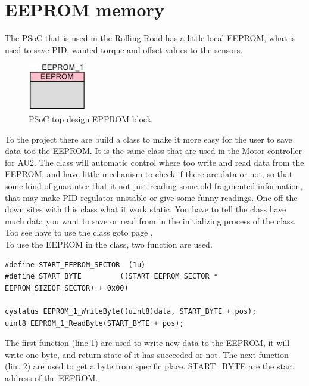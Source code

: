 \newpage
\section{EEPROM memory}
The PSoC that is used in the Rolling Road has a little local EEPROM, what is used to save PID, wanted torque and offset values to the sensors.

\begin{figure}[H]
	\centering
	\includegraphics [width=1in]{Software/Pictures/EEPROM_block.PNG}
	\caption{PSoC top design EPPROM block}
	\label{fig:EEPROM_block}
\end{figure}

To the project there are build a class to make it more easy for the user to save data too the EEPROM. It is the same class that are used in the Motor controller for AU2. The class will automatic control where too write and read data from the EEPROM, and have little mechanism to check if there are data or not, so that some kind of guarantee that it not just reading some old fragmented information, that may make PID regulator unstable or give some funny readings. One off the down sites with this class what it work static. You have to tell the class have much data you want to save or read from in the initializing process of the class. Too see have to use the class goto page \pageref{table:Class_description_EEPROM_RR_PSoC}. \\
To use the EEPROM in the class, two function are used.

\lstset{language=C}
\begin{lstlisting}
#define START_EEPROM_SECTOR  (1u)
#define START_BYTE         ((START_EEPROM_SECTOR * EEPROM_SIZEOF_SECTOR) + 0x00)

cystatus EEPROM_1_WriteByte((uint8)data, START_BYTE + pos);
uint8 EEPROM_1_ReadByte(START_BYTE + pos);
\end{lstlisting}

The first function (line 1) are used to write new data to the EEPROM, it will write one byte, and return state of it has succeeded or not. The next function (lint 2) are used to get a byte from specific place. START\_BYTE are the start address of the EEPROM. 